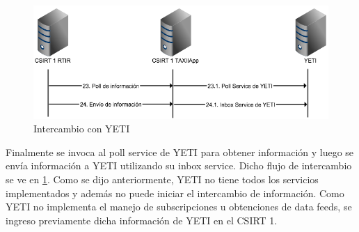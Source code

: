 \begin{figure}[H]
	\centering
	\includegraphics[scale=0.5]{flujos/flujo23-24.png}
	\caption{Intercambio con YETI}
	\label{fig.flujos2324}
\end{figure}

Finalmente se invoca al poll service de YETI para obtener información y luego se envía información a YETI utilizando su inbox service. Dicho flujo de intercambio se ve en \ref{fig.flujos2324}. Como se dijo anteriormente, YETI no tiene todos los servicios implementados y además no puede iniciar el intercambio de información. Como YETI  no implementa el manejo de subscripciones u obtenciones de data feeds, se ingreso previamente dicha información de YETI en el CSIRT 1.